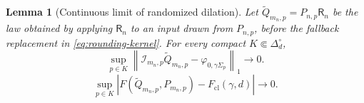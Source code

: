 \documentclass[11pt]{article}
\newtheorem{lemma}[lemma]{Lemma}
\theoremstyle{remark}
\theoremstyle{plain}
\newcommand{\Fcl}{F_{\mathrm{cl}}}
\begin{document}
\begin{lemma}[Continuous limit of randomized dilation]
\label{lem:randomized-dilation}
Let \(\widetilde Q_{m_n,p}=P_{n,p}\mathsf R_n\) be the law
obtained by applying \(\mathsf R_n\) to an input drawn from \(P_{n,p}\), before
the fallback replacement in \eqref{eq:rounding-kernel}.  For every compact
\(K\Subset\Delta_d^\circ\),
\begin{equation}\label{eq:rounded-density-limit}
  \sup_{p\in K}
  \left\|\mathcal I_{m_n,p}\widetilde Q_{m_n,p}
  -\varphi_{0,\gamma\Sigma_p}\right\|_1\longrightarrow0.
\end{equation}
\begin{equation}\label{eq:raw-rounded-affinity}
  \sup_{p\in K}
  \left|F(\widetilde Q_{m_n,p},P_{m_n,p})-\Fcl(\gamma,d)\right|
  \longrightarrow0.
\end{equation}
\end{lemma}
\end{document}

